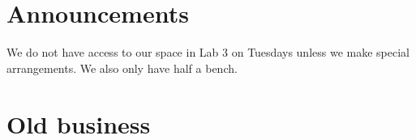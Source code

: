 \documentclass[a4paper,11pt,twoside,class=meetingmins,crop=false]{standalone}
\begin{document}

\maketitle

\section{Announcements}
\begin{items}
    \item We do not have access to our space in Lab 3 on Tuesdays unless we make special arrangements. We also only have half a bench.
\end{items}

\section{Old business}
\begin{items}
    \item \priormins
\end{items}
\end{document}
